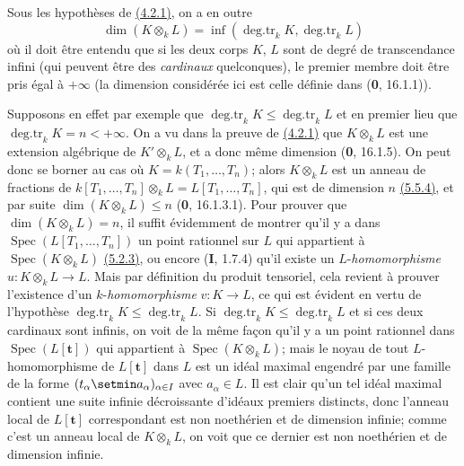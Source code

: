 \begin{remark}[4.2.1.4]
\label{IV.4.2.1.4}
Sous les hypothèses de {\hyperref[canon-index.ega4.c04.prop.4-2-1]{(4.2.1)}}, on a
en outre
\begin{equation}
 \dim(K\otimes_kL)=
 \inf(\operatorname{deg.tr}_kK,\operatorname{deg.tr}_kL)
 \label{IV.4.2.1.5}\tag{4.2.1.5}
\end{equation}
où il doit être entendu que si les deux corps $K$, $L$ sont de degré de
transcendance infini (qui peuvent être des \emph{cardinaux} quelconques), le
premier membre doit être pris égal à $+\infty$ (la dimension considérée
ici est celle définie dans (\textbf{0}, 16.1.1)).

Supposons en effet par exemple que
$\operatorname{deg.tr}_kK\leq\operatorname{deg.tr}_kL$ et en premier
lieu que $\operatorname{deg.tr}_kK=n<+\infty$. On a vu dans la preuve
de {\hyperref[canon-index.ega4.c04.prop.4-2-1]{(4.2.1)}} que $K\otimes_kL$ est une
extension algébrique de $K'\otimes_kL$, et a donc même dimension
(\textbf{0}, 16.1.5). On peut donc se borner au cas où
$K=k(T_1,\ldots,T_n)$; alors $K\otimes_kL$ est un anneau de fractions
de
$k[T_1,\ldots,T_n]\otimes_kL=L[T_1,\ldots,T_n]$,
qui est de dimension $n$ {\hyperref[canon-index.ega4.c04.cor.5-5-4]{(5.5.4)}}, et
par suite $\dim(K\otimes_kL)\leq n$ (\textbf{0}, 16.1.3.1). Pour prouver que
$\dim(K\otimes_kL)=n$, il suffit évidemment de montrer qu'il y a dans
$\operatorname{Spec}(L[T_1,\ldots,T_n])$ un point rationnel sur $L$
qui appartient à $\operatorname{Spec}(K\otimes_kL)$
{\hyperref[canon-index.ega4.c04.cor.5-2-3]{(5.2.3)}}, ou encore (\textbf{I}, 1.7.4) qu'il
existe un $L$-\emph{homomorphisme} $u:K\otimes_kL\to L$. Mais par définition
du produit tensoriel, cela revient à prouver l'existence d'un
$k$-\emph{homomorphisme} $v:K\to L$, ce qui est évident en vertu de
l'hypothèse
$\operatorname{deg.tr}_kK\leq\operatorname{deg.tr}_kL$.
Si $\operatorname{deg.tr}_kK\leq\operatorname{deg.tr}_kL$ et si ces
deux cardinaux sont infinis, on voit de la même façon qu'il y a un point
rationnel dans $\operatorname{Spec}(L[\mathbf{t}])$ qui
appartient à $\operatorname{Spec}(K\otimes_kL)$; mais le noyau de tout
$L$-homomorphisme de $L[\mathbf{t}]$ dans $L$ est un
idéal maximal engendré par une famille de la forme
$(t_\alpha\setmin a_\alpha)_{\alpha\in I}$ avec $a_\alpha\in L$. Il est clair
qu'un tel idéal maximal contient une suite infinie décroissante
d'idéaux premiers distincts, donc l'anneau local de
$L[\mathbf{t}]$ correspondant est non noethérien et de
dimension infinie; comme c'est un anneau local de $K\otimes_kL$, on
voit que ce dernier est non noethérien et de dimension infinie.
\end{remark}

